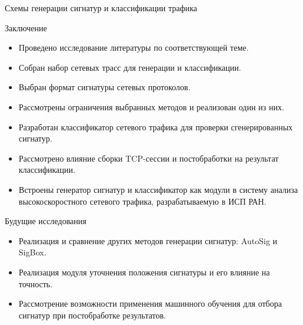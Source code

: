 \documentclass[10pt]{beamer}
\begin{document}
\begin{frame}{Схемы генерации сигнатур и классификации трафика}
    \begin{figure}
        \begin{adjustwidth}{-2em}{-2em}
            \centering
            
        \end{adjustwidth}
    \end{figure}
    \begin{figure}
        \begin{adjustwidth}{-2em}{-2em}
            \centering
            
        \end{adjustwidth}
    \end{figure}
\end{frame}


\begin{frame}{Заключение}
    \begin{itemize}
        \item Проведено исследование литературы по соответствующей теме.
        \item Собран набор сетевых трасс для генерации и классификации.
        \item Выбран формат сигнатуры сетевых протоколов.
        \item Рассмотрены ограничения выбранных методов и реализован один из них.
        \item Разработан классификатор сетевого трафика для проверки сгенерированных сигнатур.
        \item Рассмотрено влияние сборки TCP-сессии и постобработки на результат классификации.
        \item Встроены генератор сигнатур и классификатор как модули в систему анализа высокоскоростного сетевого трафика, разрабатываемую в ИСП РАН.
    \end{itemize}
\end{frame}

\begin{frame}{Будущие исследования}
    \begin{itemize}
        \item Реализация и сравнение других методов генерации сигнатур: AutoSig и SigBox.
        \item Реализация модуля уточнения положения сигнатуры и его влияние на точность.
        \item Рассмотрение возможности применения машинного обучения для отбора сигнатур при постобработке результатов.
    \end{itemize}
\end{frame}
\end{document}
